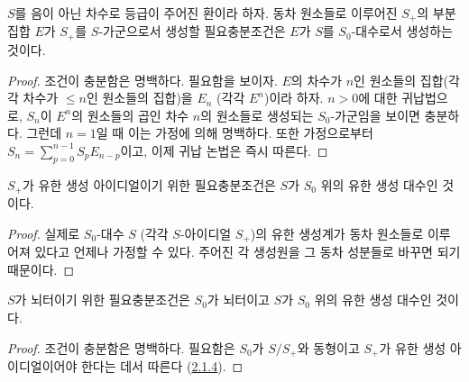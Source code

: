 \begin{lemma}[2.1.3]
\label{II.2.1.3-ko}
$S$를 음이 아닌 차수로 등급이 주어진 환이라 하자. 동차 원소들로
이루어진 $S_+$의 부분집합 $E$가 $S_+$를 $S$-가군으로서 생성할
필요충분조건은 $E$가 $S$를 $S_0$-대수로서 생성하는 것이다.
\end{lemma}

\begin{proof}
조건이 충분함은 명백하다. 필요함을 보이자. $E$의 차수가 $n$인
원소들의 집합(각각 차수가 $\leq n$인 원소들의 집합)을 $E_n$
(각각 $E^n$)이라 하자. $n>0$에 대한 귀납법으로, $S_n$이
$E^n$의 원소들의 곱인 차수 $n$의 원소들로 생성되는 $S_0$-가군임을
보이면 충분하다. 그런데 $n=1$일 때 이는 가정에 의해 명백하다.
또한 가정으로부터
$S_n=\sum_{p=0}^{n-1}S_pE_{n-p}$이고, 이제 귀납 논법은 즉시
따른다.
\end{proof}

\begin{corollary}[2.1.4]
\label{II.2.1.4-ko}
$S_+$가 유한 생성 아이디얼이기 위한 필요충분조건은 $S$가
$S_0$ 위의 유한 생성 대수인 것이다.
\end{corollary}

\begin{proof}
실제로 $S_0$-대수 $S$ (각각 $S$-아이디얼 $S_+$)의 유한 생성계가
동차 원소들로 이루어져 있다고 언제나 가정할 수 있다. 주어진 각 생성원을
그 동차 성분들로 바꾸면 되기 때문이다.
\end{proof}

\begin{corollary}[2.1.5]
\label{II.2.1.5-ko}
$S$가 뇌터이기 위한 필요충분조건은 $S_0$가 뇌터이고 $S$가
$S_0$ 위의 유한 생성 대수인 것이다.
\end{corollary}

\begin{proof}
조건이 충분함은 명백하다. 필요함은 $S_0$가 $S/S_+$와 동형이고
$S_+$가 유한 생성 아이디얼이어야 한다는 데서 따른다
(\hyperref[II.2.1.4-ko]{2.1.4}).
\end{proof}

